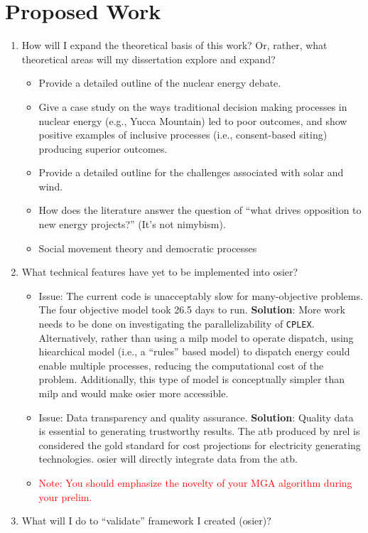 \chapter{Proposed Work}


\begin{enumerate}
    \item How will I expand the theoretical basis of this work? Or, rather, what
    theoretical areas will my dissertation explore and expand?
    \begin{itemize}
        \item Provide a detailed outline of the nuclear energy debate.
        \item Give a case study on the ways traditional decision making processes in 
        nuclear energy (e.g., Yucca Mountain) led to poor outcomes, and show positive
        examples of inclusive processes (i.e., consent-based siting) producing superior
        outcomes.
        \item Provide a detailed outline for the challenges associated with solar and wind.
        \item How does the literature answer the question of ``what drives opposition to new 
        energy projects?'' (It's not \ac{nimybism}).
        \item Social movement theory and democratic processes
    \end{itemize}
    \item What technical features have yet to be implemented into \ac{osier}?
    \begin{itemize}
        \item Issue: The current code is unacceptably slow for many-objective
        problems. The four objective model took 26.5 days to run. \textbf{Solution}:
        More work needs to be done on investigating the parallelizability of \texttt{CPLEX}.
        Alternatively, rather than using a \ac{milp} model to operate dispatch, using
        hiearchical model (i.e., a ``rules'' based model) to dispatch energy could enable
        multiple processes, reducing the computational cost of the problem. Additionally,
        this type of model is conceptually simpler than \ac{milp} and would make \ac{osier}
        more accessible.
        \item Issue: Data transparency and quality assurance. \textbf{Solution}: Quality data
        is essential to generating trustworthy results. The \ac{atb} produced by \ac{nrel} is 
        considered the gold standard for cost projections for electricity generating technologies.
        \ac{osier} will directly integrate data from the \ac{atb}.
        \item \textcolor{red}{Note: You should emphasize the novelty of your MGA algorithm during your prelim.}
    \end{itemize}
    \item What will I do to ``validate'' framework I created (\ac{osier})?
\end{enumerate}